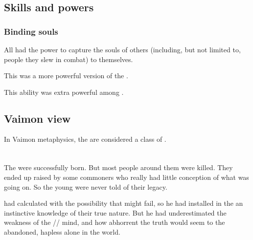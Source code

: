\subsection{Skills and powers}





\subsubsection{Binding souls}
All \malachim{} had the power to capture the souls of others (including, but not limited to, people they slew in combat) to themselves. 

This was a more powerful version of the .

This ability was extra powerful among \sathariah{} \malachim.







\subsection{Vaimon view}
In Vaimon metaphysics, the \Malachim{} are considered a class of \Archons{}. 
















\section[Merkyrah]{\Merkyrah}
The \resphain{} were successfully born. 
But most people around them were killed. 
They ended up raised by some \nephilic{} commoners who really had little conception of what was going on. 
So the young \resphain{} were never told of their legacy. 

\Daggerrain{} had calculated with the possibility that \Thanatzil{} might fail, so he had installed in the \resphain{} an instinctive knowledge of their true nature. 
But he had underestimated the weakness of the \nephilic/\human/\resphan{} mind, and how abhorrent the truth would seem to the abandoned, hapless \resphain{} alone in the world. 

